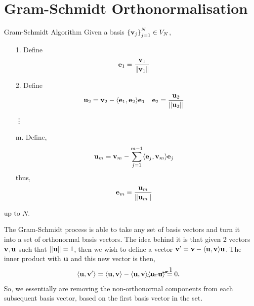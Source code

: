\documentclass{book}
\def\innerproduct#1#2{\langle#1,#2\rangle}
\begin{document}
\section{Gram-Schmidt Orthonormalisation}
\begin{Definitions}{Gram-Schmidt Algorithm}{}
	Given a basis $\left\{\vb{v}_j\right\}_{j=1}^N \in V_N$,
	\begin{itemize}
		\item[1.] Define
		\begin{equation}
			\vb{e}_1 = \frac{\vb{v}_1}{\norm{\vb{v}_1}}
		\end{equation}
		\item[2.] Define 
		\begin{align}
			\vb{u}_2 = \vb{v}_2 - \innerproduct{\vb{e}_1}{\vb{e}_2}\vb{e_1}
	&&
			\vb{e}_2 = \frac{\vb{u}_2}{\norm{\vb{u}_2}}
		\end{align}
		\item[\vdots]
		\item[m.] Define,
		\begin{equation}
			\vb{u}_m = \vb{v}_m - \sum_{j=1}^{m-1}\innerproduct{\vb{e}_j}{\vb{v}_m}\vb{e}_j
		\end{equation}
		thus,
		\begin{equation}
			\vb{e}_m = \frac{\vb{u}_m}{\norm{\vb{u}_m}}
		\end{equation}
	\end{itemize}
	up to $N$.
\end{Definitions}
The Gram-Schmidt process is able to take any set of basis vectors and turn it into a set of orthonormal basis vectors. The idea behind it is that given 2 vectors $\vb{v},\vb{u}$ such that $\norm{\vb{u}} = 1$, then we wish to define a vector $\vb{v}' = \vb{v} - \innerproduct{\vb{u}}{\vb{v}}\vb{u}$. The inner product with $\vb{u}$ and this new vector is then,
\begin{equation}
	\innerproduct{\vb{u}}{\vb{v}'} = \innerproduct{\vb{u}}{\vb{v}} - \innerproduct{\vb{u}}{\vb{v}}\cancelto{1}{\innerproduct{\vb{u}}{\vb{u}}} = 0.
\end{equation}
So, we essentially are removing the non-orthonormal components from each subsequent basis vector, based on the first basis vector in the set.
\end{document}
